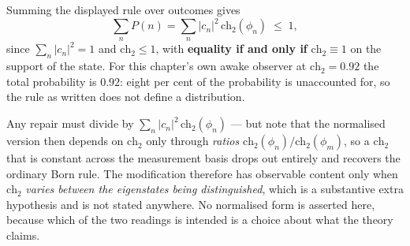\begin{remark}
\label{rem:born-unnormalised-2026-10-03}
Summing the displayed rule over outcomes gives
\[
\sum_n P(n) = \sum_n |c_n|^2\,\text{ch}_2(\phi_n) \;\leq\; 1,
\]
since $\sum_n |c_n|^2 = 1$ and $\text{ch}_2 \leq 1$, with \textbf{equality if and
only if} $\text{ch}_2 \equiv 1$ on the support of the state. For this chapter's
own awake observer at $\text{ch}_2 = 0.92$ the total probability is $0.92$: eight
per cent of the probability is unaccounted for, so the rule as written does not
define a distribution.

Any repair must divide by $\sum_n |c_n|^2\,\text{ch}_2(\phi_n)$ --- but note that
the normalised version then depends on $\text{ch}_2$ only through \emph{ratios}
$\text{ch}_2(\phi_n)/\text{ch}_2(\phi_m)$, so a $\text{ch}_2$ that is constant
across the measurement basis drops out entirely and recovers the ordinary Born
rule. The modification therefore has observable content only when
$\text{ch}_2$ \emph{varies between the eigenstates being distinguished}, which is
a substantive extra hypothesis and is not stated anywhere. No normalised form is
asserted here, because which of the two readings is intended is a choice about
what the theory claims.
\end{remark}

